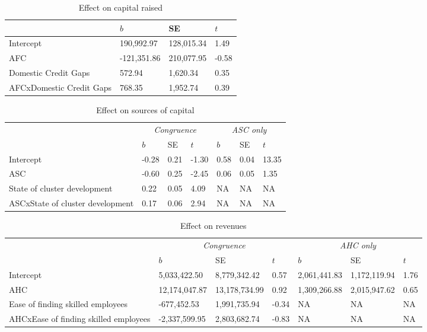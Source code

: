 \documentclass[
  english,
  man]{apa6}
\begin{document}
\begin{table}

\caption{\label{tab:unnamed-chunk-21}Effect on capital raised}
\centering
\begin{tabular}[t]{l|l|l|l}
\hline
  & $b$ & SE & $t$\\
\hline
Intercept & 190,992.97 & 128,015.34 & 1.49\\
\hline
AFC & -121,351.86 & 210,077.95 & -0.58\\
\hline
Domestic Credit Gaps & 572.94 & 1,620.34 & 0.35\\
\hline
AFCxDomestic Credit Gaps & 768.35 & 1,952.74 & 0.39\\
\hline
\end{tabular}
\end{table}

\begin{table}

\caption{\label{tab:unnamed-chunk-21}Effect on sources of capital}
\centering
\begin{tabular}[t]{l|l|l|l|l|l|l}
\hline
\multicolumn{1}{c|}{\em{ }} & \multicolumn{3}{c|}{\em{Congruence}} & \multicolumn{3}{c}{\em{ASC only}} \\
\cline{2-4} \cline{5-7}
  & $b$ & SE & $t$ & $b$ & SE & $t$\\
\hline
Intercept & -0.28 & 0.21 & -1.30 & 0.58 & 0.04 & 13.35\\
\hline
ASC & -0.60 & 0.25 & -2.45 & 0.06 & 0.05 & 1.35\\
\hline
State of cluster development & 0.22 & 0.05 & 4.09 & NA & NA & NA\\
\hline
ASCxState of cluster development & 0.17 & 0.06 & 2.94 & NA & NA & NA\\
\hline
\end{tabular}
\end{table}

\begin{table}

\caption{\label{tab:unnamed-chunk-24}Effect on revenues}
\centering
\fontsize{7}{9}\selectfont
\begin{tabular}[t]{l|l|l|l|l|l|l}
\hline
\multicolumn{1}{c|}{\em{ }} & \multicolumn{3}{c|}{\em{Congruence}} & \multicolumn{3}{c}{\em{AHC only}} \\
\cline{2-4} \cline{5-7}
  & $b$ & SE & $t$ & $b$ & SE & $t$\\
\hline
Intercept & 5,033,422.50 & 8,779,342.42 & 0.57 & 2,061,441.83 & 1,172,119.94 & 1.76\\
\hline
AHC & 12,174,047.87 & 13,178,734.99 & 0.92 & 1,309,266.88 & 2,015,947.62 & 0.65\\
\hline
Ease of finding skilled employees & -677,452.53 & 1,991,735.94 & -0.34 & NA & NA & NA\\
\hline
AHCxEase of finding skilled employees & -2,337,599.95 & 2,803,682.74 & -0.83 & NA & NA & NA\\
\hline
\end{tabular}
\end{table}
\end{document}
